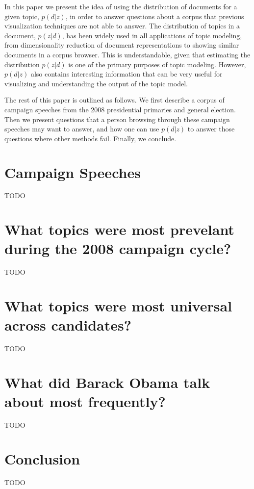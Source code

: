 \documentclass{article}
\begin{document}
In this paper we present the idea of using the distribution of documents for a
given topic, $p(d|z)$, in order to answer questions about a corpus that
previous visualization techniques are not able to answer.  The distribution of
topics in a document, $p(z|d)$, has been widely used in all applications of
topic modeling, from dimensionality reduction of document representations to
showing similar documents in a corpus browser.  This is understandable, given
that estimating the distribution $p(z|d)$ is one of the primary purposes of
topic modeling.  However, $p(d|z)$ also contains interesting information that
can be very useful for visualizing and understanding the output of the topic
model.

The rest of this paper is outlined as follows.  We first describe a corpus of
campaign speeches from the 2008 presidential primaries and general election.
Then we present questions that a person browsing through these campaign
speeches may want to answer, and how one can use $p(d|z)$ to answer those
questions where other methods fail.  Finally, we conclude.

\section{Campaign Speeches}

TODO

\section{What topics were most prevelant during the 2008 campaign cycle?}

TODO

\section{What topics were most universal across candidates?}

TODO

\section{What did Barack Obama talk about most frequently?}

TODO

\section{Conclusion}

TODO



\end{document}
